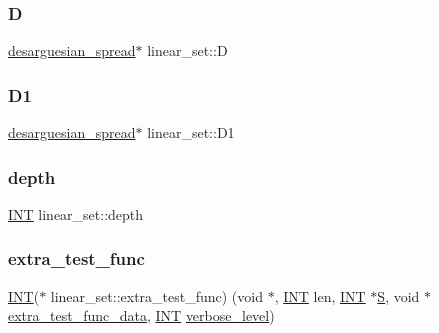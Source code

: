 \mbox{\label{classlinear__set_a9e4a5f3a65265d55e9062d14edaa2ca6}} 
\subsubsection{\texorpdfstring{D}{D}}
{\footnotesize\ttfamily \mbox{\hyperlink{classdesarguesian__spread}{desarguesian\+\_\+spread}}$\ast$ linear\+\_\+set\+::D}

\mbox{\label{classlinear__set_a0fb08f31f7792781f68c963f2eacacff}} 
\subsubsection{\texorpdfstring{D1}{D1}}
{\footnotesize\ttfamily \mbox{\hyperlink{classdesarguesian__spread}{desarguesian\+\_\+spread}}$\ast$ linear\+\_\+set\+::\+D1}

\mbox{\label{classlinear__set_ac458047edb453e716e6a936aac1afef6}} 
\subsubsection{\texorpdfstring{depth}{depth}}
{\footnotesize\ttfamily \mbox{\hyperlink{galois_8h_a09fddde158a3a20bd2dcadb609de11dc}{I\+NT}} linear\+\_\+set\+::depth}

\mbox{\label{classlinear__set_ab8e2cc2f08a613cf2e60314da57174d4}} 
\subsubsection{\texorpdfstring{extra\+\_\+test\+\_\+func}{extra\_test\_func}}
{\footnotesize\ttfamily \mbox{\hyperlink{galois_8h_a09fddde158a3a20bd2dcadb609de11dc}{I\+NT}}($\ast$ linear\+\_\+set\+::extra\+\_\+test\+\_\+func) (void $\ast$, \mbox{\hyperlink{galois_8h_a09fddde158a3a20bd2dcadb609de11dc}{I\+NT}} len, \mbox{\hyperlink{galois_8h_a09fddde158a3a20bd2dcadb609de11dc}{I\+NT}} $\ast$\mbox{\hyperlink{simeon_8_c_adab47f8243f1b5a2c31df2535d6b37d0}{S}}, void $\ast$\mbox{\hyperlink{classlinear__set_a840d0c6f1c5d0c1298b2357a1d8891ee}{extra\+\_\+test\+\_\+func\+\_\+data}}, \mbox{\hyperlink{galois_8h_a09fddde158a3a20bd2dcadb609de11dc}{I\+NT}} \mbox{\hyperlink{simeon_8_c_a818073fbcc2f439e7c56952f67386122}{verbose\+\_\+level}})}

